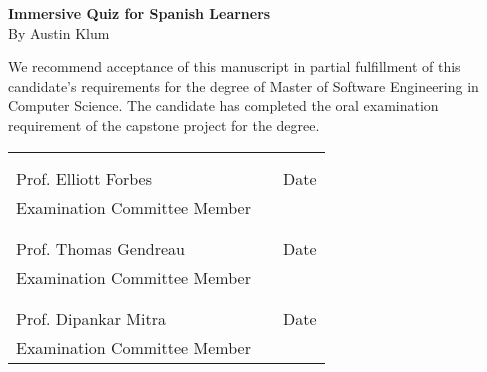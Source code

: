 \thispagestyle{empty}
\vspace*{0.3in}
\begin{center}
	\large{\textbf{Immersive Quiz for Spanish Learners}} \\ 
	\vspace{0.75in}
	\normalsize{By Austin Klum}
\end{center}

\vspace{0.5in}
\noindent We recommend acceptance of this manuscript in partial fulfillment of this candidate's requirements for the degree of Master of Software Engineering in Computer Science. The candidate has completed the oral examination requirement of the capstone project for the degree. \\

\noindent
\begin{tabularx}{\textwidth}{p{3in}Xp{2in}}
		\rule{0pt}{50pt} & & \\
	\hrulefill & & \hrulefill \\
	Prof. Elliott Forbes & & Date \\
	Examination Committee Member & & \\
	\rule{0pt}{50pt} & & \\
	\hrulefill & & \hrulefill \\
	Prof. Thomas Gendreau & & Date \\
	Examination Committee Member & & \\
	\rule{0pt}{50pt} & & \\
	\hrulefill & & \hrulefill \\
	Prof. Dipankar Mitra & & Date \\
	Examination Committee Member & & \\
\end{tabularx}

